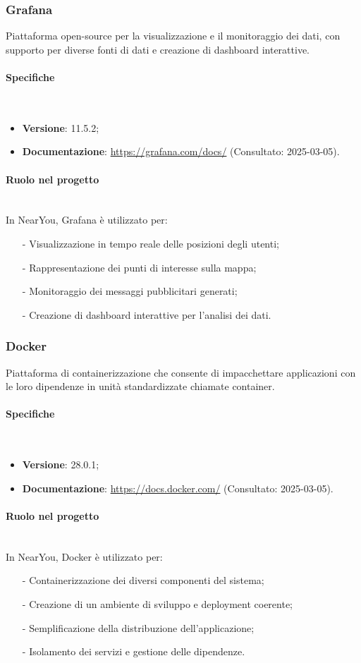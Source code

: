 \documentclass[10pt]{article}
\newcommand{\myparagraph}[1]{\paragraph{#1}\mbox{}\\}
\begin{document}
\subsubsection{Grafana}
Piattaforma open-source per la visualizzazione e il monitoraggio dei dati, con supporto per diverse fonti di dati e creazione di dashboard interattive.

\myparagraph{Specifiche}
\begin{itemize}
    \item \textbf{Versione}: 11.5.2;
    \item \textbf{Documentazione}: \textcolor{blue}{\url{https://grafana.com/docs/}} (Consultato: 2025-03-05).
\end{itemize}

\myparagraph{Ruolo nel progetto}
In NearYou, Grafana è utilizzato per:
\begin{itemize}
    \item[-] Visualizzazione in tempo reale delle posizioni degli utenti;
    \item[-] Rappresentazione dei punti di interesse sulla mappa;
    \item[-] Monitoraggio dei messaggi pubblicitari generati;
    \item[-] Creazione di dashboard interattive per l'analisi dei dati.
\end{itemize}

\subsubsection{Docker}
Piattaforma di containerizzazione che consente di impacchettare applicazioni con le loro dipendenze in unità standardizzate chiamate container.

\myparagraph{Specifiche}
\begin{itemize}
    \item \textbf{Versione}: 28.0.1;
    \item \textbf{Documentazione}: \textcolor{blue}{\url{https://docs.docker.com/}} (Consultato: 2025-03-05).
\end{itemize}

\myparagraph{Ruolo nel progetto}
In NearYou, Docker è utilizzato per:
\begin{itemize}
    \item[-] Containerizzazione dei diversi componenti del sistema;
    \item[-] Creazione di un ambiente di sviluppo e deployment coerente;
    \item[-] Semplificazione della distribuzione dell'applicazione;
    \item[-] Isolamento dei servizi e gestione delle dipendenze.
\end{itemize}
\end{document}

